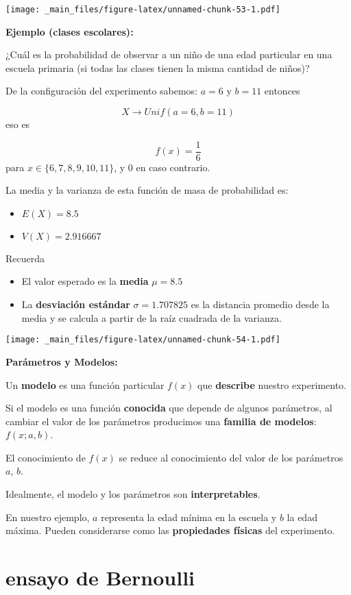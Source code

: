 \documentclass[
]{book}
\providecommand{\tightlist}{%
  \setlength{\itemsep}{0pt}\setlength{\parskip}{0pt}}
\begin{document}
\texttt{[image: \_main\_files/figure-latex/unnamed-chunk-53-1.pdf]}

\textbf{Ejemplo (clases escolares):}

¿Cuál es la probabilidad de observar a un niño de una edad particular en una escuela primaria (si todas las clases tienen la misma cantidad de niños)?

De la configuración del experimento sabemos: \(a=6\) y \(b=11\) entonces

\[X \rightarrow Unif(a=6, b=11)\] eso es

\[f(x)=\frac{1}{6}\] para \(x\in \{6,7,8,9,10,11\}\), y \(0\) en caso contrario.

La media y la varianza de esta función de masa de probabilidad es:

\begin{itemize}
\tightlist
\item
  \(E(X)=8.5\)
\item
  \(V(X)=2.916667\)
\end{itemize}

Recuerda

\begin{itemize}
\item
  El valor esperado es la \textbf{media} \(\mu=8.5\)
\item
  La \textbf{desviación estándar} \(\sigma=1.707825\) es la distancia promedio desde la media y se calcula a partir de la raíz cuadrada de la varianza.
\end{itemize}

\texttt{[image: \_main\_files/figure-latex/unnamed-chunk-54-1.pdf]}

\textbf{Parámetros y Modelos:}

Un \textbf{modelo} es una función particular \(f(x)\) que \textbf{describe} nuestro experimento.

Si el modelo es una función \textbf{conocida} que depende de algunos parámetros, al cambiar el valor de los parámetros producimos una \textbf{familia de modelos}: \(f(x; a,b)\).

El conocimiento de \(f(x)\) se reduce al conocimiento del valor de los parámetros \(a\), \(b\).

Idealmente, el modelo y los parámetros son \textbf{interpretables}.

En nuestro ejemplo, \(a\) representa la edad mínima en la escuela y \(b\) la edad máxima. Pueden considerarse como las \textbf{propiedades físicas} del experimento.

\hypertarget{ensayo-de-bernoulli}{%
\section{ensayo de Bernoulli}\label{ensayo-de-bernoulli}}
\end{document}
